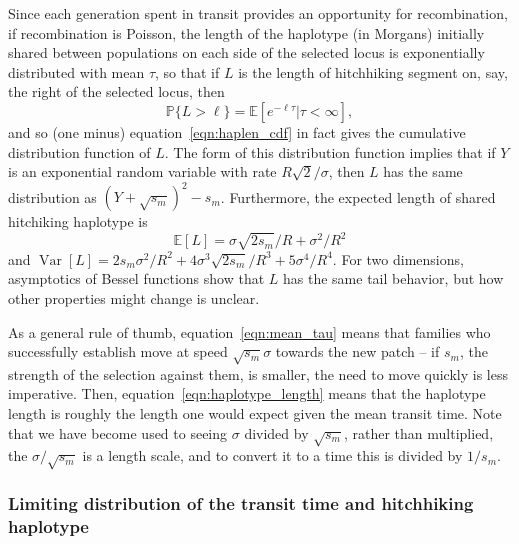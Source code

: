 \documentclass{article}
\DeclareMathOperator{\var}{Var}
\renewcommand{\P}{\mathbb{P}}
\newcommand{\E}{\mathbb{E}}
\begin{document}
Since each generation spent in transit provides an opportunity for recombination,
if recombination is Poisson, the length of the haplotype (in Morgans)
initially shared between populations on each side of the selected locus is exponentially distributed
with mean $\tau$, so that if $L$ is the length of hitchhiking segment on, say, the right of
the selected locus, then
\begin{equation} \label{eqn:haplen_cdf2}
\P\{L>\ell\} = \E[e^{-\ell \tau}|\tau<\infty] ,
\end{equation}
and so (one minus) equation~\eqref{eqn:haplen_cdf} in fact gives the cumulative distribution function of $L$.
The form of this distribution function implies that if $Y$ is an exponential random variable with rate $R\sqrt{2}/\sigma$,
then $L$ has the same distribution as $(Y + \sqrt{s_m})^2 - s_m$.
Furthermore, the expected length of shared hitchiking haplotype is
\begin{equation} \label{eqn:haplotype_length}
\E[L] = \sigma \sqrt{2s_m}/R + \sigma^2/R^2
\end{equation}
and $\var[L] = 2s_m\sigma^2/R^2 + 4 \sigma^3 \sqrt{2s_m}/R^3 + 5 \sigma^4 / R^4$.
For two dimensions, asymptotics of Bessel functions show that $L$ has the same tail behavior,
but how other properties might change is unclear. 

As a general rule of thumb, equation~\eqref{eqn:mean_tau} means that families who successfully establish
move at speed $\sqrt{s_m} \sigma$ towards the new patch 
-- if $s_m$, the strength of the selection against them, is smaller, the need to move quickly is less imperative.
Then, equation~\eqref{eqn:haplotype_length} means that the haplotype length
is roughly the length one would expect given the mean transit time.
Note that we have become used to seeing $\sigma$ divided by $\sqrt{s_m}$, rather than multiplied,
the $\sigma/\sqrt{s_m}$ is a length scale, and to convert it to a time this is divided by $1/s_m$.



\subsubsection{Limiting distribution of the transit time and hitchhiking haplotype}
\end{document}
